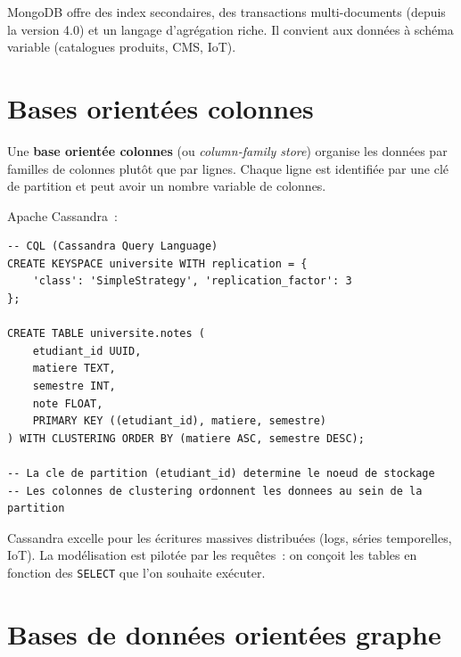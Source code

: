 \begin{remarque}
MongoDB offre des index secondaires, des transactions multi-documents
(depuis la version 4.0) et un langage d'agr\'egation riche. Il convient
aux donn\'ees \`a sch\'ema variable (catalogues produits, CMS, IoT).
\end{remarque}

\section{Bases orient\'ees colonnes}

\begin{definition}
Une \textbf{base orient\'ee colonnes} (ou \emph{column-family store})
organise les donn\'ees par familles de colonnes plut\^ot que par lignes.
Chaque ligne est identifi\'ee par une cl\'e de partition et peut avoir un
nombre variable de colonnes.
\end{definition}

\begin{exemple}
Apache Cassandra~:
\begin{verbatim}
-- CQL (Cassandra Query Language)
CREATE KEYSPACE universite WITH replication = {
    'class': 'SimpleStrategy', 'replication_factor': 3
};

CREATE TABLE universite.notes (
    etudiant_id UUID,
    matiere TEXT,
    semestre INT,
    note FLOAT,
    PRIMARY KEY ((etudiant_id), matiere, semestre)
) WITH CLUSTERING ORDER BY (matiere ASC, semestre DESC);

-- La cle de partition (etudiant_id) determine le noeud de stockage
-- Les colonnes de clustering ordonnent les donnees au sein de la partition
\end{verbatim}
\end{exemple}

\begin{remarque}
Cassandra excelle pour les \'ecritures massives distribu\'ees (logs,
s\'eries temporelles, IoT). La mod\'elisation est pilot\'ee par les
requ\^etes~: on con\c{c}oit les tables en fonction des \texttt{SELECT}
que l'on souhaite ex\'ecuter.
\end{remarque}

\section{Bases de donn\'ees orient\'ees graphe}

